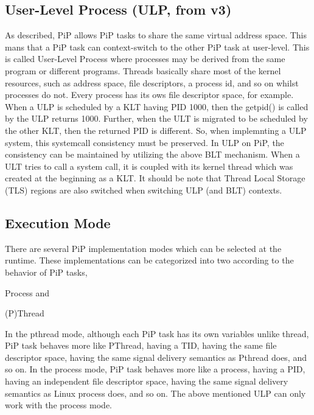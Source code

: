 \subsection*{User-\/\-Level Process (U\-L\-P, from v3)}

As described, Pi\-P allows Pi\-P tasks to share the same virtual address space. This mans that a Pi\-P task can context-\/switch to the other Pi\-P task at user-\/level. This is called User-\/\-Level Process where processes may be derived from the same program or different programs. Threads basically share most of the kernel resources, such as address space, file descriptors, a process id, and so on whilst processes do not. Every process has its ows file descriptor space, for example. When a U\-L\-P is scheduled by a K\-L\-T having P\-I\-D 1000, then the getpid() is called by the U\-L\-P returns 1000. Further, when the U\-L\-T is migrated to be scheduled by the other K\-L\-T, then the returned P\-I\-D is different. So, when implemnting a U\-L\-P system, this systemcall consistency must be preserved. In U\-L\-P on Pi\-P, the consistency can be maintained by utilizing the above B\-L\-T mechanism. When a U\-L\-T tries to call a system call, it is coupled with its kernel thread which was created at the beginning as a K\-L\-T. It should be note that Thread Local Storage (T\-L\-S) regions are also switched when switching U\-L\-P (and B\-L\-T) contexts.

\subsection*{Execution Mode}

There are several Pi\-P implementation modes which can be selected at the runtime. These implementations can be categorized into two according to the behavior of Pi\-P tasks,


\begin{DoxyItemize}
\item Process and
\item (P)Thread
\end{DoxyItemize}

In the pthread mode, although each Pi\-P task has its own variables unlike thread, Pi\-P task behaves more like P\-Thread, having a T\-I\-D, having the same file descriptor space, having the same signal delivery semantics as Pthread does, and so on. In the process mode, Pi\-P task behaves more like a process, having a P\-I\-D, having an independent file descriptor space, having the same signal delivery semantics as Linux process does, and so on. The above mentioned U\-L\-P can only work with the process mode.

